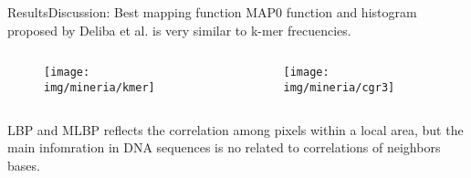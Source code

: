 \documentclass[10pt]{beamer}
\newcommand{\1}{
	\setbeamertemplate{background}{
		\texttt{[image: img/1]}
		\tikz[overlay] \fill[fill opacity=0.75,fill=white] (0,0) rectangle (-\paperwidth,\paperheight);
	}
}
\begin{document}
\begin{frame}{Results}{Discussion: Best mapping function}
	MAP0 function and histogram proposed by Deliba et al. \cite{delibacs2020dna} is very similar to k-mer frecuencies.  \cite{karlin1994comparisons, campbell1999genome, shedlock2007phylogenomics, wu2001statistical, sims2009alignment, sims2011whole, wu2005optimal, dai2008markov, haubold2014alignment, karamichalis2015investigation, vinga2003alignment}
	
	
	\begin{columns}
		\begin{column}{0.48\textwidth}
			\begin{figure}[]
				\centering
				\texttt{[image: img/mineria/kmer]}		
			\end{figure}
		\end{column}
		\begin{column}{0.48\textwidth}
			\begin{figure}[]
				\centering
				\texttt{[image: img/mineria/cgr3]}		
			\end{figure}
		\end{column}
	\end{columns}
	
	\begin{block}{}
		LBP and MLBP reflects the correlation among pixels within a local area, but the main infomration in DNA sequences is no related to correlations of neighbors bases.
	\end{block}

	

\end{frame}




\end{document}
